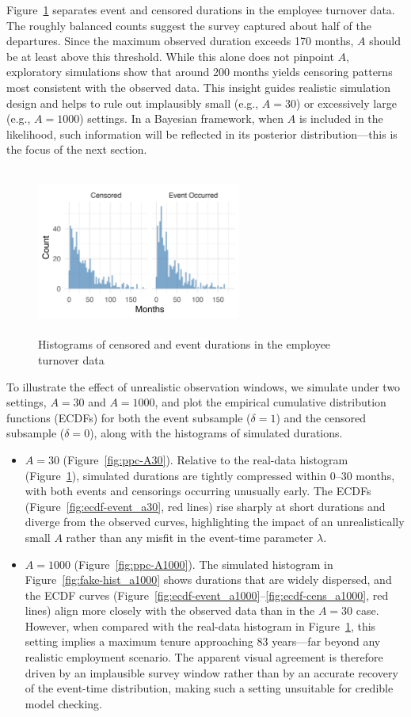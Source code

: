 Figure~\ref{fig:离职数据分开的直方图} separates event and censored durations in the employee turnover data. The roughly balanced counts suggest the survey captured about half of the departures. Since the maximum observed duration exceeds 170 months, $A$ should be at least above this threshold. While this alone does not pinpoint $A$, exploratory simulations show that around 200 months yields censoring patterns most consistent with the observed data. This insight guides realistic simulation design and helps to rule out implausibly small (e.g., $A=30$) or excessively large (e.g., $A=1000$) settings. In a Bayesian framework, when $A$ is included in the likelihood, such information will be reflected in its posterior distribution—this is the focus of the next section.
\begin{figure}[H]
    \centering
    \includegraphics[height=5.5cm, width=0.6\textwidth]{images/separate_hist.png}
    \caption{{\small Histograms of censored and event durations in the employee turnover data}}
    \label{fig:离职数据分开的直方图}
\end{figure}
To illustrate the effect of unrealistic observation windows, we simulate under two settings, $A = 30$ and $A = 1000$, and plot the empirical cumulative distribution functions (ECDFs) for both the event subsample ($\delta = 1$) and the censored subsample ($\delta = 0$), along with the histograms of simulated durations.
\begin{itemize}
    \item $A = 30$ (Figure~\ref{fig:ppc-A30}). Relative to the real-data histogram (Figure~\ref{fig:离职数据分开的直方图}), simulated durations are tightly compressed within 0–30 months, with both events and censorings occurring unusually early. The ECDFs (Figure~\ref{fig:ecdf-event_a30}, red lines) rise sharply at short durations and diverge from the observed curves, highlighting the impact of an unrealistically small $A$ rather than any misfit in the event-time parameter $\lambda$.
    \item $A = 1000$ (Figure~\ref{fig:ppc-A1000}). The simulated histogram in Figure~\ref{fig:fake-hist_a1000} shows durations that are widely dispersed, and the ECDF curves (Figure~\ref{fig:ecdf-event_a1000}–\ref{fig:ecdf-cens_a1000}, red lines) align more closely with the observed data than in the $A=30$ case. However, when compared with the real-data histogram in Figure~\ref{fig:离职数据分开的直方图}, this setting implies a maximum tenure approaching 83 years—far beyond any realistic employment scenario. The apparent visual agreement is therefore driven by an implausible survey window rather than by an accurate recovery of the event-time distribution, making such a setting unsuitable for credible model checking.
\end{itemize}
